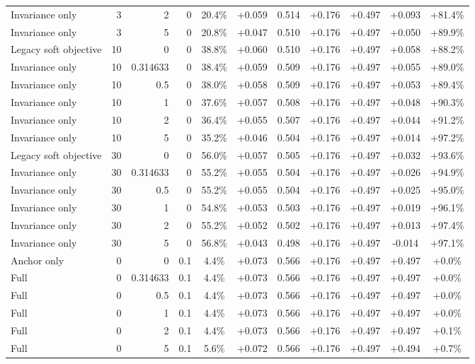 \begin{table}[htbp]
\begin{tabular}{lrrrccccccc}
Invariance only & 3 & 2 & 0 & 20.4\% & +0.059 & 0.514 & +0.176 & +0.497 & +0.093 & +81.4\% \\
Invariance only & 3 & 5 & 0 & 20.8\% & +0.047 & 0.510 & +0.176 & +0.497 & +0.050 & +89.9\% \\
Legacy soft objective & 10 & 0 & 0 & 38.8\% & +0.060 & 0.510 & +0.176 & +0.497 & +0.058 & +88.2\% \\
Invariance only & 10 & 0.314633 & 0 & 38.4\% & +0.059 & 0.509 & +0.176 & +0.497 & +0.055 & +89.0\% \\
Invariance only & 10 & 0.5 & 0 & 38.0\% & +0.058 & 0.509 & +0.176 & +0.497 & +0.053 & +89.4\% \\
Invariance only & 10 & 1 & 0 & 37.6\% & +0.057 & 0.508 & +0.176 & +0.497 & +0.048 & +90.3\% \\
Invariance only & 10 & 2 & 0 & 36.4\% & +0.055 & 0.507 & +0.176 & +0.497 & +0.044 & +91.2\% \\
Invariance only & 10 & 5 & 0 & 35.2\% & +0.046 & 0.504 & +0.176 & +0.497 & +0.014 & +97.2\% \\
Legacy soft objective & 30 & 0 & 0 & 56.0\% & +0.057 & 0.505 & +0.176 & +0.497 & +0.032 & +93.6\% \\
Invariance only & 30 & 0.314633 & 0 & 55.2\% & +0.055 & 0.504 & +0.176 & +0.497 & +0.026 & +94.9\% \\
Invariance only & 30 & 0.5 & 0 & 55.2\% & +0.055 & 0.504 & +0.176 & +0.497 & +0.025 & +95.0\% \\
Invariance only & 30 & 1 & 0 & 54.8\% & +0.053 & 0.503 & +0.176 & +0.497 & +0.019 & +96.1\% \\
Invariance only & 30 & 2 & 0 & 55.2\% & +0.052 & 0.502 & +0.176 & +0.497 & +0.013 & +97.4\% \\
Invariance only & 30 & 5 & 0 & 56.8\% & +0.043 & 0.498 & +0.176 & +0.497 & -0.014 & +97.1\% \\
Anchor only & 0 & 0 & 0.1 & 4.4\% & +0.073 & 0.566 & +0.176 & +0.497 & +0.497 & +0.0\% \\
Full & 0 & 0.314633 & 0.1 & 4.4\% & +0.073 & 0.566 & +0.176 & +0.497 & +0.497 & +0.0\% \\
Full & 0 & 0.5 & 0.1 & 4.4\% & +0.073 & 0.566 & +0.176 & +0.497 & +0.497 & +0.0\% \\
Full & 0 & 1 & 0.1 & 4.4\% & +0.073 & 0.566 & +0.176 & +0.497 & +0.497 & +0.0\% \\
Full & 0 & 2 & 0.1 & 4.4\% & +0.073 & 0.566 & +0.176 & +0.497 & +0.497 & +0.1\% \\
Full & 0 & 5 & 0.1 & 5.6\% & +0.072 & 0.566 & +0.176 & +0.497 & +0.494 & +0.7\% \\

\end{tabular}
\end{table}
